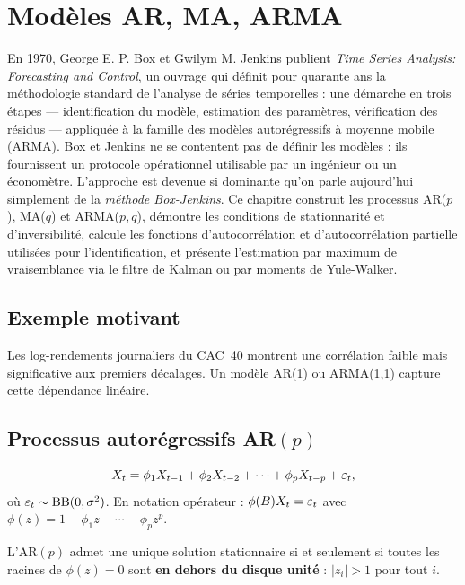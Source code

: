 \chapter{Mod\`eles AR, MA, ARMA}
\label{ch:arma}

En 1970, George E. P. Box et Gwilym M. Jenkins publient \emph{Time Series Analysis: Forecasting and Control}, un ouvrage qui définit pour quarante ans la méthodologie standard de l'analyse de séries temporelles : une démarche en trois étapes --- identification du modèle, estimation des paramètres, vérification des résidus --- appliquée à la famille des modèles autorégressifs à moyenne mobile (ARMA). Box et Jenkins ne se contentent pas de définir les modèles : ils fournissent un protocole opérationnel utilisable par un ingénieur ou un économètre. L'approche est devenue si dominante qu'on parle aujourd'hui simplement de la \emph{méthode Box-Jenkins}. Ce chapitre construit les processus AR($p$), MA($q$) et ARMA($p,q$), démontre les conditions de stationnarité et d'inversibilité, calcule les fonctions d'autocorrélation et d'autocorrélation partielle utilisées pour l'identification, et présente l'estimation par maximum de vraisemblance via le filtre de Kalman ou par moments de Yule-Walker.

\section{Exemple motivant}
Les log-rendements journaliers du CAC~40 montrent une corr\'elation faible mais significative aux premiers d\'ecalages. Un mod\`ele AR(1) ou ARMA(1,1) capture cette d\'ependance lin\'eaire.

\section{Processus autor\'egressifs AR$(p)$}

\begin{definition}[AR$(p)$]
\[
X_t = \phi_1 X_{t-1} + \phi_2 X_{t-2} + \cdots + \phi_p X_{t-p} + \varepsilon_t,
\]
o\`u $\varepsilon_t\sim\mathrm{BB}(0,\sigma^2)$. En notation op\'erateur : $\phi(B)X_t = \varepsilon_t$ avec $\phi(z)=1-\phi_1 z-\cdots-\phi_p z^p$.
\end{definition}

\begin{theoreme}[Stationnarit\'e d'un AR$(p)$]\label{thm:ar-stat}
L'AR$(p)$ admet une unique solution stationnaire si et seulement si toutes les racines de $\phi(z)=0$ sont \textbf{en dehors du disque unit\'e} : $|z_i|>1$ pour tout $i$.
\end{theoreme}

